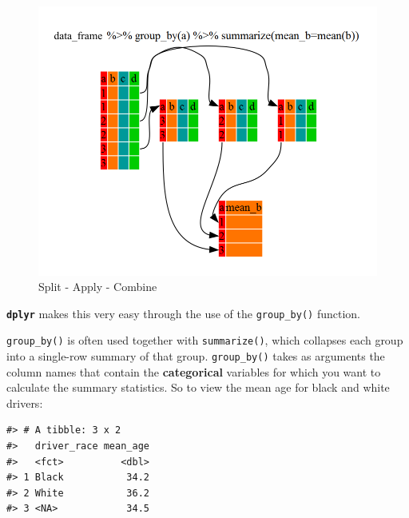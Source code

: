 \documentclass[]{book}
\newenvironment{Shaded}{\begin{snugshade}}{\end{snugshade}}
\newcommand{\KeywordTok}[1]{\textcolor[rgb]{0.13,0.29,0.53}{\textbf{#1}}}
\newcommand{\DataTypeTok}[1]{\textcolor[rgb]{0.13,0.29,0.53}{#1}}
\newcommand{\StringTok}[1]{\textcolor[rgb]{0.31,0.60,0.02}{#1}}
\newcommand{\OtherTok}[1]{\textcolor[rgb]{0.56,0.35,0.01}{#1}}
\newcommand{\OperatorTok}[1]{\textcolor[rgb]{0.81,0.36,0.00}{\textbf{#1}}}
\newcommand{\NormalTok}[1]{#1}
\theoremstyle{definition}
\theoremstyle{definition}
\theoremstyle{definition}
\theoremstyle{remark}
\begin{document}
\begin{figure}
\includegraphics[width=\textwidth]{img/split-apply-combine} \caption{Split - Apply - Combine}\label{fig:split-apply-combine}
\end{figure}

\textbf{\texttt{dplyr}} makes this very easy through the use of the
\texttt{group\_by()} function.

\texttt{group\_by()} is often used together with \texttt{summarize()},
which collapses each group into a single-row summary of that group.
\texttt{group\_by()} takes as arguments the column names that contain
the \textbf{categorical} variables for which you want to calculate the
summary statistics. So to view the mean age for black and white drivers:

\begin{Shaded}
\end{Shaded}

\begin{verbatim}
#> # A tibble: 3 x 2
#>   driver_race mean_age
#>   <fct>          <dbl>
#> 1 Black           34.2
#> 2 White           36.2
#> 3 <NA>            34.5
\end{verbatim}
\end{document}
